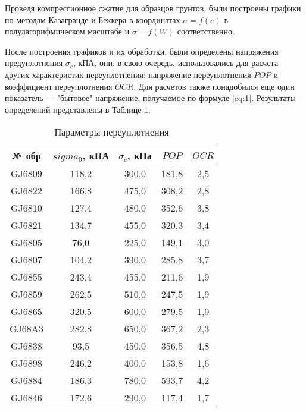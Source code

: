 Проведя компрессионное сжатие для образцов грунтов, были построены 
графики по методам Казагранде и Беккера в координатах $\sigma = f(e)$ 
в полулагорифмическом масштабе и $\sigma = f(W)$ соответственно.

После построения графиков и их обработки, были определены 
напряжения предуплотнения $\sigma_c$, кПА,
они, в свою очередь, использовались для расчета 
других характеристик переуплотнения: напряжение 
переуплотнения $POP$ и коэффициент переуплотнения $OCR$.
Для расчетов также понадобился еще один показатель --- 
"бытовое" напряжение, получаемое по формуле \ref{eq:1}.
Результаты определений представлены в Таблице \ref{tab:komp}.

\begin{table}[]
  \centering
  \begin{threeparttable}
    \caption{Параметры переуплотнения}\label{tab:komp}
  \begin{tabular}{|c|c|c|c|c|}
  \hline
  № обр  & $sigma_0$, кПА & $\sigma_c$, кПа & $POP$   & $OCR$ \\ \hline
  GJ6809 & 118,2  & 300,0   & 181,8 & 2,5 \\ \hline
  GJ6822 & 166,8  & 475,0   & 308,2 & 2,8 \\ \hline
  GJ6810 & 127,4  & 480,0   & 352,6 & 3,8 \\ \hline
  GJ6821 & 134,7  & 455,0   & 320,3 & 3,4 \\ \hline
  GJ6805 & 76,0   & 225,0   & 149,1 & 3,0 \\ \hline
  GJ6807 & 104,2  & 390,0   & 285,8 & 3,7 \\ \hline
  GJ6855 & 243,4  & 455,0   & 211,6 & 1,9 \\ \hline
  GJ6859 & 262,5  & 510,0   & 247,5 & 1,9 \\ \hline
  GJ6865 & 320,5  & 600,0   & 279,5 & 1,9 \\ \hline
  GJ68A3 & 282,8  & 650,0   & 367,2 & 2,3 \\ \hline
  GJ6838 & 93,5   & 450,0   & 356,5 & 4,8 \\ \hline
  GJ6898 & 246,2  & 400,0   & 153,8 & 1,6 \\ \hline
  GJ6884 & 186,3  & 780,0   & 593,7 & 4,2 \\ \hline
  GJ6846 & 172,6  & 290,0   & 117,4 & 1,7 \\ \hline
  \end{tabular}
\end{threeparttable}
  \end{table}

